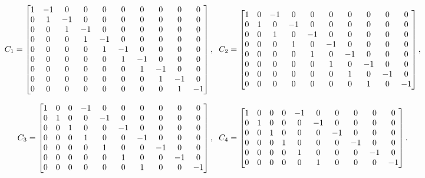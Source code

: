 \begin{strip}
$$ C_1 = \begin{bmatrix} 1 & -1 & 0 & 0 & 0 & 0& 0 & 0& 0 &0\\
    0 & 1 & -1 & 0 & 0 & 0& 0 & 0& 0 &0 \\
    0 & 0 & 1 & -1 & 0 & 0& 0 & 0& 0 &0 \\
    0 & 0 & 0 & 1 & -1 & 0 & 0& 0 & 0& 0 \\
    0 & 0 & 0& 0 & 1 & -1 & 0 & 0& 0 & 0 \\
    0 & 0 & 0 & 0 & 0 & 1 & -1 & 0 & 0& 0 \\
    0 & 0 & 0 & 0 & 0&  0 & 1 & -1 & 0 & 0\\
    0 & 0 & 0 & 0 & 0 &0 & 0 & 1 & -1 & 0 \\
    0 & 0 & 0 & 0 & 0 &0 &0 & 0 & 1 & -1 \end{bmatrix}, \hspace{2mm}
    C_2 =  \begin{bmatrix} 1 & 0 & -1 & 0 & 0 & 0& 0 & 0& 0 &0\\
    0 & 1 & 0 & -1 & 0 & 0& 0 & 0& 0 &0 \\
    0 & 0 & 1 & 0 & -1 & 0& 0 & 0& 0 &0 \\
    0 & 0 & 0 & 1 & 0 & -1 & 0& 0 & 0& 0 \\
    0 & 0 & 0& 0 & 1 & 0 & -1 & 0& 0 & 0 \\
    0 & 0 & 0 & 0 & 0 & 1 & 0 & -1 & 0& 0 \\
    0 & 0 & 0 & 0 & 0&  0 & 1 & 0 & -1 & 0\\
    0 & 0 & 0 & 0 & 0 &0 & 0 & 1 & 0 & -1\end{bmatrix},
$$


$$ C_3 =  \begin{bmatrix} 1 & 0 & 0 & -1 & 0 & 0& 0 & 0& 0 &0\\
    0 & 1 & 0 & 0 & -1& 0& 0 & 0& 0 &0 \\
    0 & 0 & 1 & 0 & 0 & -1& 0 & 0& 0 &0 \\
    0 & 0 & 0 & 1 & 0 & 0 & -1& 0 & 0& 0 \\
    0 & 0 & 0& 0 & 1 & 0 & 0& -1& 0 & 0 \\
    0 & 0 & 0 & 0 & 0 & 1 & 0 & 0 & -1& 0 \\
    0 & 0 & 0 & 0 & 0&  0 & 1 & 0 & 0 & -1\end{bmatrix}, \hspace{2mm}
    C_4 =  \begin{bmatrix} 1 & 0 & 0 & 0 & -1 & 0& 0 & 0& 0 &0\\
    0 & 1 & 0 & 0 & 0& -1& 0 & 0& 0 &0 \\
    0 & 0 & 1 & 0 & 0 & 0& -1 & 0& 0 &0 \\
    0 & 0 & 0 & 1 & 0 & 0 & 0& -1 & 0& 0 \\
    0 & 0 & 0& 0 & 1 & 0 & 0& 0& -1 & 0 \\
    0 & 0 & 0 & 0 & 0 & 1 & 0 & 0 & 0& -1\end{bmatrix}.
$$
\end{strip}
